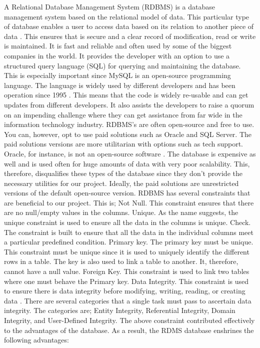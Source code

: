 A Relational Database Management System (RDBMS) is a database management system based on the relational model of data. This particular type of database enables a user to access data based on its relation to another piece of data \cite{CODE}. This ensures that is secure and a clear record of modification, read or write is maintained. It is fast and reliable and often used by some of the biggest companies in the world. It provides the developer with an option to use a structured query language (SQL) for querying and maintaining the database. 
\newline
\newline
This is especially important since MySQL is an open-source programming language. The language is widely used by different developers and has been operation since 1995 \cite{CODE}. This means that the code is widely re-usable and can get updates from different developers. It also assists the developers to raise a quorum on an impending challenge where they can get assistance from far wide in the information technology industry. 
\newline
\newline
RDBMS’s are often open-source and free to use. You can, however, opt to use paid solutions such as Oracle and SQL Server. The paid solutions versions are more utilitarian with options such as tech support.  Oracle, for instance, is not an open-source software \cite{ORA}. The database is expensive as well and is used often for huge amounts of data with very poor scalability. This, therefore, disqualifies these types of the database since they don’t provide the necessary utilities for our project. Ideally, the paid solutions are unrestricted versions of the default open-source version. 
\newline
\newline
RDBMS has several constraints that are beneficial to our project. This is; Not Null. This constraint ensures that there are no null/empty values in the columns. Unique. As the name suggests, the unique constraint is used to ensure all the data in the columns is unique. Check. The constraint is built to ensure that all the data in the individual columns meet a particular predefined condition. Primary key.  The primary key must be unique. This constraint must be unique since it is used to uniquely identify the different rows in a table. The key is also used to link a table to another. It, therefore, cannot have a null value. Foreign Key. This constraint is used to link two tables where one must behave the Primary key. Data Integrity. This constraint is used to ensure there is data integrity before modifying, writing, reading, or creating data \cite{RDBMS}. There are several categories that a single task must pass to ascertain data integrity. The categories are; Entity Integrity, Referential Integrity, Domain Integrity, and User-Defined Integrity. \cite{RDBMS}
The above constraint contributed effectively to the advantages of the database.  As a result, the RDMS database enshrines the following advantages:

